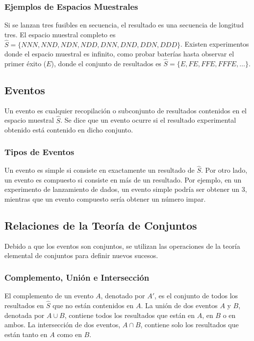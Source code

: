 \documentclass[a4paper]{article}
\begin{document}
\subsubsection{Ejemplos de Espacios Muestrales}

Si se lanzan tres fusibles en secuencia, el resultado es una secuencia de longitud tres. El espacio muestral completo es $\hat{S} = \{NNN, NND, NDN, NDD, DNN, DND, DDN, DDD\}$. Existen experimentos donde el espacio muestral es infinito, como probar baterías hasta observar el primer éxito ($E$), donde el conjunto de resultados es $\hat{S} = \{E, FE, FFE, FFFE, \dots\}$.

\subsection{Eventos}

Un evento es cualquier recopilación o subconjunto de resultados contenidos en el espacio muestral $\hat{S}$. Se dice que un evento ocurre si el resultado experimental obtenido está contenido en dicho conjunto.

\subsubsection{Tipos de Eventos}

Un evento es simple si consiste en exactamente un resultado de $\hat{S}$. Por otro lado, un evento es compuesto si consiste en más de un resultado. Por ejemplo, en un experimento de lanzamiento de dados, un evento simple podría ser obtener un 3, mientras que un evento compuesto sería obtener un número impar.

\subsection{Relaciones de la Teoría de Conjuntos}

Debido a que los eventos son conjuntos, se utilizan las operaciones de la teoría elemental de conjuntos para definir nuevos sucesos.

\subsubsection{Complemento, Unión e Intersección}

El complemento de un evento $A$, denotado por $A'$, es el conjunto de todos los resultados en $\hat{S}$ que no están contenidos en $A$. La unión de dos eventos $A$ y $B$, denotada por $A \cup B$, contiene todos los resultados que están en $A$, en $B$ o en ambos. La intersección de dos eventos, $A \cap B$, contiene solo los resultados que están tanto en $A$ como en $B$.
\end{document}
